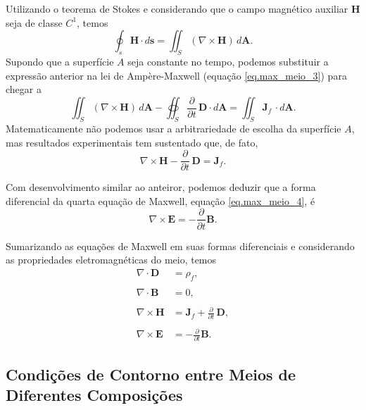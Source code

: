 Utilizando o teorema de Stokes e considerando que o campo  magn\'etico auxiliar $\mathbf{H}$ seja de classe $C^1$, temos
\begin{equation*}
\oint_s\mathbf{H}\cdot d\mathbf{s}=\iint_S(\nabla\times\mathbf{H})\,d\mathbf{A}.
\end{equation*}
Supondo que a superf\'icie $A$ seja constante no tempo, podemos substituir a express\~ao anterior na lei de Amp\`ere-Maxwell (equa\c{c}\~ao \ref{eq.max_meio_3}) para chegar a
\begin{equation*}
\iint_S(\nabla\times\mathbf{H})\,d\mathbf{A}-\oiint_S\frac{\partial}{\partial t}\,\mathbf{D}\cdot d\mathbf{A}=\iint_S\mathbf{J}_f\,\cdot d\mathbf{A}.
\end{equation*}
Matematicamente n\~ao podemos usar a arbitrariedade de escolha da superf\'icie $A$, mas resultados experimentais tem sustentado que, de fato,
\begin{equation*}
\nabla\times\mathbf{H}-\frac{\partial}{\partial t}\,\mathbf{D}=\mathbf{J}_f.
\end{equation*}

Com desenvolvimento similar ao anteiror, podemos deduzir que a forma diferencial da quarta equa\c{c}\~ao de Maxwell, equa\c{c}\~ao \ref{eq.max_meio_4}, \'e
\begin{equation*}
\nabla\times\mathbf{E}=-\frac{\partial}{\partial t}\mathbf{B}.
\end{equation*}

Sumarizando as equa\c{c}\~oes de Maxwell em suas formas diferenciais e considerando as propriedades eletromagn\'eticas do meio, temos
\begin{align}\label{eq.dif_max_1}
\nabla\cdot\mathbf{D}&=\rho_f,\\\nonumber\\\label{eq.dif_max_2}
\nabla\cdot\mathbf{B}&=0,\\\nonumber\\\label{eq.dif_max_3}
\nabla\times\mathbf{H}&=\mathbf{J}_f+\frac{\partial}{\partial t}\,\mathbf{D},\\\nonumber\\\label{eq.dif_max_4}
\nabla\times\mathbf{E}&=-\frac{\partial}{\partial t}\mathbf{B}.
\end{align}

\subsection{Condi\c{c}\~oes de Contorno entre Meios de Diferentes Composi\c{c}\~oes}\label{sec.condicoes_contorno_geral}

